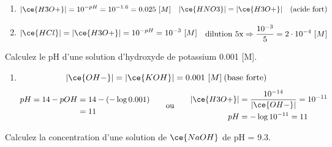 \documentclass[
  11pt,
  french,
  a4paper,
  openany]{book}
\providecommand{\tightlist}{%
  \setlength{\itemsep}{0pt}\setlength{\parskip}{0pt}}
\begin{document}
\begin{Answer}

\begin{enumerate}
\def\labelenumi{\alph{enumi}.}
\tightlist
\item
  \[
  \begin{split}
  |\ce{H3O+}| = 10^{-pH} = 10^{-1.6} = 0.025\ [M]
  \end{split}
  \quad
  \begin{split}
  |\ce{HNO3}| = |\ce{H3O+}| \quad \text{(acide fort)}
  \end{split}
  \]
\item
  \[
  \begin{split}
  |\ce{HCl}| = |\ce{H3O+}| = 10^{-pH} = 10^{-3}\ [M]
  \end{split}
  \quad
  \begin{split}
  \text{dilution 5x} \Rightarrow \frac{10^{-3}}{5} = 2 \cdot 10^{-4}\ [M]
  \end{split}
  \]
\end{enumerate}


\end{Answer}

\begin{Exercise}
Calculez le pH d'une solution d'hydroxyde de potassium 0.001 {[}M{]}.

\end{Exercise}

\begin{Answer}

\begin{enumerate}
\def\labelenumi{\alph{enumi}.}
\tightlist
\item
  \[ |\ce{OH-}| = |\ce{KOH}| = 0.001\ [M] \: \text{(base forte)} \]
  \[
  \begin{split}
  pH = 14 - pOH &= 14 - ( - \log 0.001 ) \\
    &= 11
  \end{split}
  \qquad \text{ou} \qquad
  \begin{split}
  |\ce{H3O+}| &= \frac{10^{-14}}{|\ce{OH-}|} = 10^{-11} \\
  pH &= - \log 10^{-11} = 11
  \end{split}
  \]
\end{enumerate}


\end{Answer}

\begin{Exercise}
Calculez la concentration d'une solution de \(\ce{NaOH}\) de pH = 9.3.

\end{Exercise}
\end{document}
